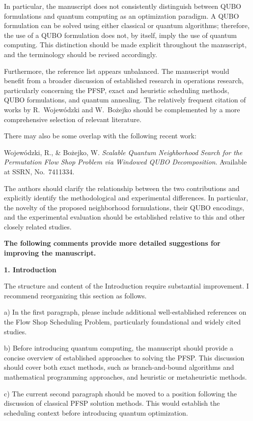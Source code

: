 \documentclass[12pt]{article}
\begin{document}
In particular, the manuscript does not consistently distinguish between QUBO formulations and quantum computing as an optimization paradigm. A QUBO formulation can be solved using either classical or quantum algorithms; therefore, the use of a QUBO formulation does not, by itself, imply the use of quantum computing. This distinction should be made explicit throughout the manuscript, and the terminology should be revised accordingly.

Furthermore, the reference list appears unbalanced. The manuscript would benefit from a broader discussion of established research in operations research, particularly concerning the PFSP, exact and heuristic scheduling methods, QUBO formulations, and quantum annealing. The relatively frequent citation of works by R.~Wojewódzki and W.~Bożejko should be complemented by a more comprehensive selection of relevant literature.

There may also be some overlap with the following recent work:

Wojewódzki, R., \& Bożejko, W. \emph{Scalable Quantum Neighborhood Search for the Permutation Flow Shop Problem via Windowed QUBO Decomposition}. Available at SSRN, No.~7411334.

The authors should clarify the relationship between the two contributions and explicitly identify the methodological and experimental differences. In particular, the novelty of the proposed neighborhood formulations, their QUBO encodings, and the experimental evaluation should be established relative to this and other closely related studies.

\textbf{The following comments provide more detailed suggestions for improving the manuscript.}

\textbf{1. Introduction}

The structure and content of the Introduction require substantial improvement. I recommend reorganizing this section as follows.

a) In the first paragraph, please include additional well-established references on the Flow Shop Scheduling Problem, particularly foundational and widely cited studies.

b) Before introducing quantum computing, the manuscript should provide a concise overview of established approaches to solving the PFSP. This discussion should cover both exact methods, such as branch-and-bound algorithms and mathematical programming approaches, and heuristic or metaheuristic methods.

c) The current second paragraph should be moved to a position following the discussion of classical PFSP solution methods. This would establish the scheduling context before introducing quantum optimization.
\end{document}
